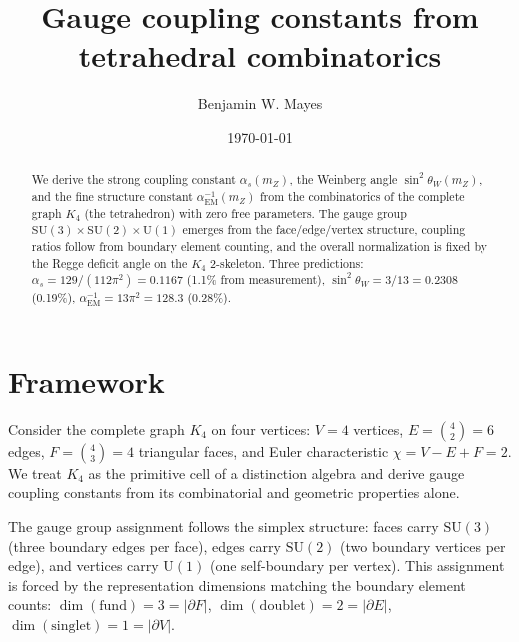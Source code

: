 \documentclass[aps,prl,twocolumn,superscriptaddress,showpacs]{revtex4-2}
\begin{document}
\title{Gauge coupling constants from tetrahedral combinatorics}

\author{Benjamin W. Mayes}

\date{\today}

\begin{abstract}
We derive the strong coupling constant $\alpha_s(m_Z)$, the
Weinberg angle $\sin^2\theta_W(m_Z)$, and the fine structure
constant $\alpha_{\mathrm{EM}}^{-1}(m_Z)$ from the combinatorics
of the complete graph $K_4$ (the tetrahedron) with zero free
parameters. The gauge group $\mathrm{SU}(3)\times\mathrm{SU}(2)
\times\mathrm{U}(1)$ emerges from the face/edge/vertex structure,
coupling ratios follow from boundary element counting, and the
overall normalization is fixed by the Regge deficit angle on the
$K_4$ 2-skeleton. Three predictions:
$\alpha_s = 129/(112\pi^2) = 0.1167$ (1.1\% from measurement),
$\sin^2\theta_W = 3/13 = 0.2308$ (0.19\%),
$\alpha_{\mathrm{EM}}^{-1} = 13\pi^2 = 128.3$ (0.28\%).
\end{abstract}

\maketitle


\section{Framework}

Consider the complete graph $K_4$ on four vertices: $V=4$ vertices,
$E=\binom{4}{2}=6$ edges, $F=\binom{4}{3}=4$ triangular faces,
and Euler characteristic $\chi = V - E + F = 2$. We treat $K_4$ as
the primitive cell of a distinction algebra and derive gauge coupling
constants from its combinatorial and geometric properties alone.

The gauge group assignment follows the simplex structure:
faces carry $\mathrm{SU}(3)$ (three boundary edges per face),
edges carry $\mathrm{SU}(2)$ (two boundary vertices per edge),
and vertices carry $\mathrm{U}(1)$ (one self-boundary per vertex).
This assignment is forced by the representation dimensions matching
the boundary element counts: $\dim(\mathrm{fund}) = 3 = |\partial F|$,
$\dim(\mathrm{doublet}) = 2 = |\partial E|$,
$\dim(\mathrm{singlet}) = 1 = |\partial V|$.
\end{document}
